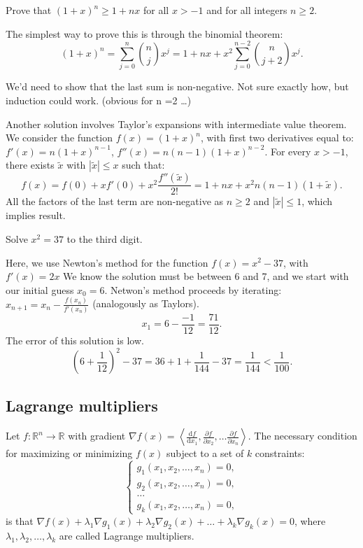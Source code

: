 \begin{qanda}
  \Q 
  Prove that $(1+x)^n \geq 1 + nx$ for all $x>-1$ and for all integers $n\geq 2$.

  \A
  The simplest way to prove this is through the binomial theorem:
  \[
      (1 + x)^n = \sum_{j=0}^{n} \binom{n}{j} x^j = 1 + nx + x^2\sum_{j=0}^{n-2} \binom{n}{j+2} x^j.
  \]

  We'd need to show that the last sum is non-negative. Not sure exactly how, but induction could work. (obvious for n =2 \ldots)

  Another solution involves Taylor's expansions with intermediate value theorem.
  We consider the function $f(x) = (1 + x)^n$, with first two derivatives equal to: 
  $f'(x) = n (1 + x)^{n-1}$,
  $f''(x) = n(n-1) (1 + x)^{n-2}$.
  For every $x> -1$, there exists $\tilde{x}$ with $|\tilde{x}| \leq x$ such that:
    \[
    f(x) = f(0) + x f'(0) + x^2 \frac{f''(\tilde{x})}{2!} = 1 + nx + x^2 n(n-1)(1+\tilde{x}).
    \]
    All the factors of the last term are non-negative as $n\geq 2$ and $|\tilde{x}| \leq1$, which implies result.
\end{qanda}

\begin{qanda}
    \Q
    Solve $x^2 = 37$ to the third digit.

    \A
    Here, we use Newton's method for the function $f(x) = x^2 - 37$, with $f'(x)=2x$
    We know the solution must be between 6 and 7, and we start with our initial guess $x_0 = 6$.
    Netwon's method proceeds by iterating: $x_{n+1} = x_n - \frac{f(x_n)}{f'(x_n)}$ (analogously as Taylors).
    \[
    x_1 = 6 - \frac{-1}{12} = \frac{71}{12}.
    \]
    The error of this solution is low.
    \[
        \left( 6 + \frac{1}{12} \right)^2 - 37 = 36 + 1 + \frac{1}{144} - 37 = \frac{1}{144} < \frac{1}{100}.
    \]
\end{qanda}


\subsection{Lagrange multipliers}

Let $f\colon \mathbb{R}^n \to \mathbb{R}$ with gradient $\nabla f(x) = \left\langle \frac{\mathrm{d}f}{\mathrm{d}x_1}, \frac{\partial f }{\partial x_2}, \dots \frac{\partial f }{\partial x_n} \right\rangle$.
The necessary condition for maximizing or minimizing $f(x)$ subject to a set of $k$ constraints:
\[
\begin{cases}
  g_1(x_1, x_2, \dots, x_n) = 0, \\
  g_2(x_1, x_2, \dots, x_n) = 0, \\
  \dots \\
  g_k(x_1, x_2, \dots, x_n) = 0,
\end{cases}
\]
is that $\nabla f(x) + \lambda_1 \nabla g_1(x) + \lambda_2 \nabla g_2(x) + \dots + \lambda_k \nabla g_k(x) = 0$, where $\lambda_1, \lambda_2, \dots, \lambda_k$ are called Lagrange multipliers.

